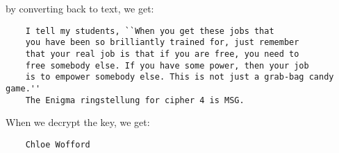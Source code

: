 \begin{Answer}
  by converting back to text, we get:
  \begin{Verbatim}
    I tell my students, ``When you get these jobs that 
    you have been so brilliantly trained for, just remember
    that your real job is that if you are free, you need to
    free somebody else. If you have some power, then your job
    is to empower somebody else. This is not just a grab-bag candy  game.''
    The Enigma ringstellung for cipher 4 is MSG.
  \end{Verbatim}

  \noindent
  When we decrypt the key, we get:
  \begin{Verbatim}
    Chloe Wofford
  \end{Verbatim}
  
\end{Answer}
